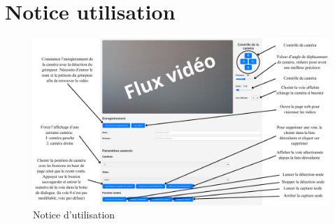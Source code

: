 \documentclass[a4paper, 11pt, french]{article}
\begin{document}
\section{Notice utilisation}
\begin{figure}[!ht]
    \centering
    \includegraphics[width=\textwidth]{noticeSuiviGrimpeur.pdf}
    \caption{Notice d'utilisation}
    \label{fig:noticeUtilisation}
\end{figure}
\end{document}
